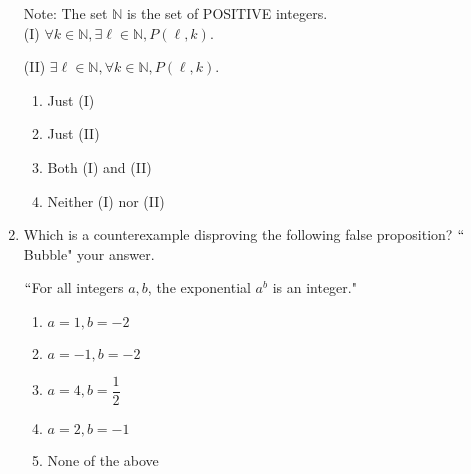 \documentclass[12pt]{amsart}
\theoremstyle{definition}
\theoremstyle{remark}
\newcommand{\nats}{\mathbb N}
\begin{document}
\begin{enumerate}
Note:  The set $\nats$ is the set of POSITIVE integers.\\



(I)  $\forall k\in\nats,\exists \ell\in \nats, P(\ell,k)$.


\bigskip

(II)  $\exists \ell\in \nats,\forall k\in \nats, P(\ell,k)$.




\vspace{1cm}


	\begin{enumerate}
        \item[$\bigcirc$ (a)] Just (I)
\bigskip
		\item[$\bigcirc$ (b)] Just (II)
\bigskip
		\item[{\color{red}\begin{large}$\bullet$\end{large} (c)}] Both (I) and (II)  %
\bigskip
		\item[$\bigcirc$ (d)] Neither (I) nor (II)
	\end{enumerate}



\vspace{0.5cm}

\item Which is a counterexample disproving the following false proposition?  $``$Bubble" your answer.

\bigskip

\begin{center}
$``$For all integers $a,b$, the exponential $a^{b}$ is an integer."

\end{center}


\vspace{1cm}

	\begin{enumerate}
		\item[$\bigcirc$ (a)] $a=1,b=-2$
\bigskip
		\item[$\bigcirc$ (b)] $a=-1,b=-2$
\bigskip
		\item[$\bigcirc$ (c)] $a=4,b=\dfrac{1}{2}$
\bigskip
		\item[{\color{red}\begin{large}$\bullet$\end{large} (d)}] $a=2,b=-1$ %
\bigskip
		\item[$\bigcirc$ (e)] None of the above
	\end{enumerate}


\end{enumerate}
\end{document}
